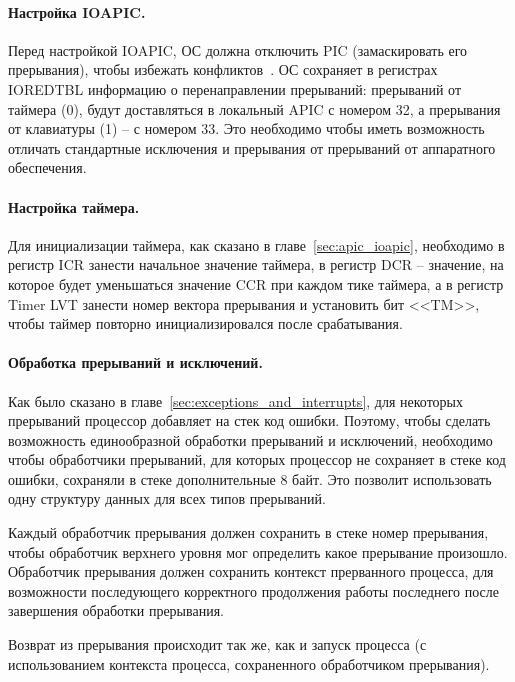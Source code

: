 \paragraph{Настройка IOAPIC.} Перед настройкой IOAPIC, ОС должна отключить PIC (замаскировать его прерывания),
чтобы избежать конфликтов~\cite{os_dev}. ОС сохраняет в регистрах IOREDTBL информацию о перенаправлении
прерываний: прерываний от таймера (0), будут доставляться в локальный APIC с номером 32, а прерывания от
клавиатуры (1) -- с номером 33. Это необходимо чтобы иметь возможность отличать стандартные исключения и
прерывания от прерываний от аппаратного обеспечения.

\paragraph{Настройка таймера.} Для инициализации таймера, как сказано в главе~\ref{sec:apic_ioapic},
необходимо в регистр ICR занести начальное значение таймера, в регистр DCR -- значение, на которое
будет уменьшаться значение CCR при каждом тике таймера, а в регистр Timer LVT занести номер вектора прерывания и
установить бит <<TM>>, чтобы таймер повторно инициализировался после срабатывания.

\paragraph{Обработка прерываний и исключений.} Как было сказано в главе~\ref{sec:exceptions_and_interrupts},
для некоторых прерываний процессор добавляет на стек код ошибки. Поэтому, чтобы сделать возможность единообразной
обработки прерываний и исключений, необходимо чтобы обработчики прерываний, для которых процессор не сохраняет в стеке
код ошибки, сохраняли в стеке дополнительные 8 байт. Это позволит использовать одну структуру данных для всех типов прерываний.

Каждый обработчик прерывания должен сохранить в стеке номер прерывания, чтобы обработчик верхнего уровня
мог определить какое прерывание произошло. Обработчик прерывания должен сохранить контекст прерванного
процесса, для возможности последующего корректного продолжения работы последнего после завершения обработки
прерывания.

Возврат из прерывания происходит так же, как и запуск процесса (с использованием контекста процесса,
сохраненного обработчиком прерывания).

